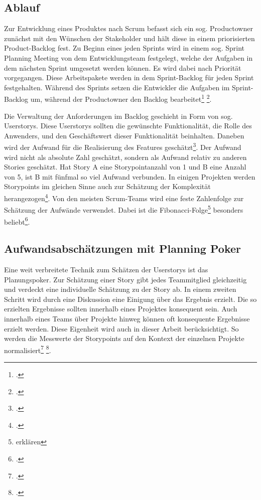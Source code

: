 \subsection{Ablauf}\label{Ablauf}

Zur Entwicklung eines Produktes nach Scrum befasst sich ein sog.
Productowner zunächst mit den Wünschen der Stakeholder und hält diese in
einem priorisierten Product-Backlog fest. Zu Beginn eines jeden Sprints
wird in einem sog. Sprint Planning Meeting von dem Entwicklungsteam
festgelegt, welche der Aufgaben in dem nächsten Sprint umgesetzt werden
können. Es wird dabei nach Priorität vorgegangen. Diese Arbeitspakete
werden in dem Sprint-Backlog für jeden Sprint festgehalten. Während des
Sprints setzen die Entwickler die Aufgaben im Sprint-Backlog um, während
der Productowner den Backlog bearbeitet\footcite[Vgl. ][]{schwaberAgileSoftwareDevelopment2002}
\footcite[Vgl. ][]{schwaberAgileProjectManagement2004}.

Die Verwaltung der Anforderungen im Backlog geschieht in Form von sog.
Userstorys. Diese Userstorys sollten die gewünschte Funktionalität, die
Rolle des Anwenders, und den Geschäftswert dieser Funktionalität
beinhalten. Daneben wird der Aufwand für die Realisierung des Features
geschätzt\footcite[Vgl. ][]{cohnUserStoriesApplied2004}. Der Aufwand wird nicht
als absolute Zahl geschätzt, sondern als Aufwand relativ zu anderen
Stories geschätzt. Hat Story A eine Storypointanzahl von 1 und B eine
Anzahl von 5, ist B mit fünfmal so viel Aufwand verbunden. In einigen
Projekten werden Storypoints im gleichen Sinne auch zur Schätzung der
Komplexität herangezogen\footcite[Vgl. ][]{Quelle fehlt}. Von den meisten
Scrum-Teams wird eine feste Zahlenfolge zur Schätzung der Aufwände
verwendet. Dabei ist die Fibonacci-Folge\footnote{erklären} besonders
beliebt\footcite[Vgl. ][]{Quelle fehlt}.

\subsection{Aufwandsabschätzungen mit Planning Poker}\label{Aufwandsabschatzungen-mit-Planning-Poker}

Eine weit verbreitete Technik zum Schätzen der Userstorys ist das
Planungspoker. Zur Schätzung einer Story gibt jedes Teammitglied
gleichzeitig und verdeckt eine individuelle Schätzung zu der Story ab.
In einem zweiten Schritt wird durch eine Diskussion eine Einigung über
das Ergebnis erzielt. Die so erzielten Ergebnisse sollten innerhalb
eines Projektes konsequent sein. Auch innerhalb eines Teams über
Projekte hinweg können oft konsequente Ergebnisse erzielt werden. Diese
Eigenheit wird auch in dieser Arbeit berücksichtigt. So werden die
Messwerte der Storypoints auf den Kontext der einzelnen Projekte
normalisiert\footcite{Quelle ergänzen cohnAgileEstimatingPlanning2006}
\footcite[Vgl. ][]{(daltonGreatBigAgile2019a S. 203).}.
